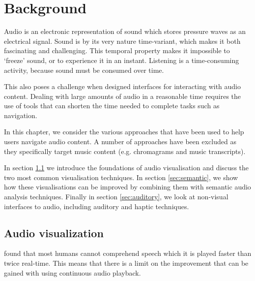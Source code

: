 \chapter{Background}\label{chp:background}

Audio is an electronic representation of sound which stores pressure waves as an electrical signal.
Sound is by its very nature time-variant, which makes it both fascinating and challenging.
This temporal property makes it impossible to `freeze' sound, or to experience it in an instant. Listening is a
time-consuming activity, because sound must be consumed over time.



This also poses a challenge when designed interfaces for interacting with audio content. Dealing with large amounts of
audio in a reasonable time requires the use of tools that can shorten the time needed to complete tasks such as
navigation.

In this chapter, we consider the various approaches that have been used to help users navigate audio content.
A number of approaches have been excluded as they specifically target music content (e.g. chromagrams and music
transcripts).

In section \ref{sec:visualization} we introduce the foundations of audio visualisation and discuss the two most common
visualisation techniques. In section \ref{sec:semantic}, we show how these visualisations can be improved by combining
them with semantic audio analysis techniques. Finally in section \ref{sec:auditory}, we look at non-visual interfaces
to audio, including auditory and haptic techniques.

\section{Audio visualization}\label{sec:visualization}

\citet{Arons1997} found that most humans cannot comprehend speech which it is played faster than twice real-time. This
means that there is a limit on the improvement that can be gained with using continuous audio playback.

